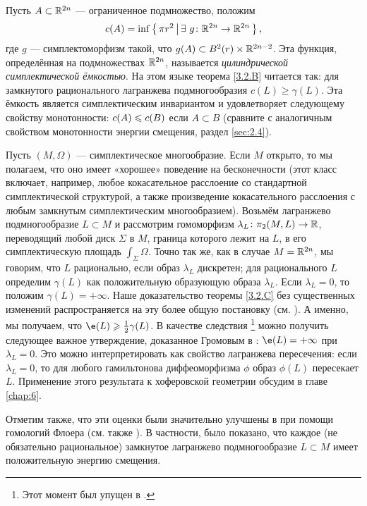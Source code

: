 \begin{ex}{}\label{3.2.F}
Пусть $A \subset \mathbb{R}^{2n}$ — ограниченное подмножество, положим 
\[c(A) = \inf \left\{ \,{\pi r^2}\, \middle| \,{ \exists\  g\colon \mathbb{R}^{2n} \to \mathbb{R}^{2n}}\, \right\},\]
где $g$ — симплектоморфизм такой, что $g (A) \subset B^2 (r) \times \mathbb{R}^{2n - 2}$.
Эта функция, определённая на подмножествах $\mathbb{R}^{2n}$, называется \emph{цилиндрической симплектической ёмкостью}.
На этом языке теорема \ref{3.2.B} читается так:
для замкнутого рационального лагранжева подмногообразия $c(L) \ge \gamma (L)$.
Эта ёмкость является симплектическим инвариантом и удовлетворяет следующему свойству монотонности:
$c (A) \z\le c (B)$ если $A \subset B$ (сравните с аналогичным свойством
монотонности энергии смещения, раздел \ref{sec:2.4}).
\end{ex}



\begin{ex}{}\label{3.2.G}
Пусть $(M, \Omega)$ — симплектическое многообразие.
Если $M$ открыто, то мы полагаем, что оно имеет «хорошее» поведение на
бесконечности (этот класс включает, например, любое кокасательное
расслоение со стандартной симплектической структурой, а также
произведение кокасательного расслоения с любым замкнутым
симплектическим многообразием). 
Возьмём лагранжево подмногообразие $L \subset M$ и рассмотрим
гомоморфизм $\lambda_L\colon \pi_2 (M, L) \z\to \RR$, переводящий любой
диск $\Sigma$ в $M$, граница которого лежит на $L$, в его
симплектическую площадь $\int_\Sigma \Omega$. 
Точно так же, как в случае $M = \mathbb{R}^{2n}$, мы говорим, что $L$
рационально, если образ $\lambda_L$ дискретен; для рационального $L$
определим $\gamma (L)$ как положительную образующую образа
$\lambda_L$. 
Если $\lambda_L = 0$, то положим $\gamma (L) = + \infty$.
Наше доказательство теоремы \ref{3.2.C} без существенных изменений
распространяется на эту более общую постановку (см. \cite{P1}). 
А именно, мы получаем, что $\e (L) \ge \tfrac12 \gamma (L)$.
В качестве следствия%
\footnote{Этот момент был упущен в \cite[с. 359]{P1}.}
можно получить следующее важное утверждение, доказанное Громовым в \cite{G1}:
$\e (L) = + \infty$ при $\lambda_L = 0$.
Это можно интерпретировать как свойство лагранжева пересечения: если $\lambda_L = 0$, то  для любого гамильтонова диффеоморфизма $\phi$ образ $\phi (L)$ пересекает $L$.
Применение этого результата к хоферовской геометрии обсудим в главе \ref{chap:6}.

Отметим также, что эти оценки были значительно улучшены в \cite{Ch} при помощи гомологий Флоера (см. также \cite{O3}).
В частности, было показано, что каждое (не обязательно рациональное) замкнутое лагранжево подмногообразие $L \subset M$ имеет положительную энергию смещения.
\end{ex}


